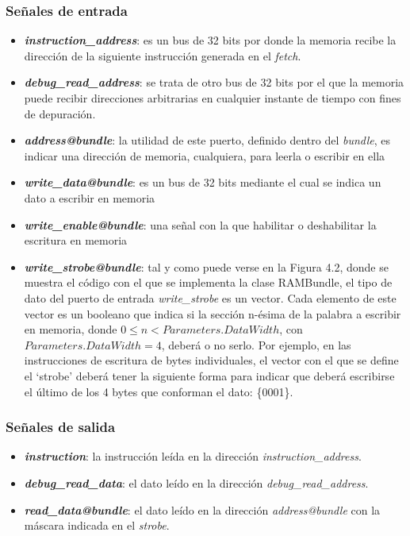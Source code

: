 \subsubsection{Señales de entrada}

\begin{itemize}
  \item \textbf{\textit{instruction\_address}}: es un bus de 32 bits por donde la memoria recibe la dirección de la siguiente instrucción generada en el \textit{fetch}.
  \vspace{-0.2cm}
  \item \textbf{\textit{debug\_read\_address}}: se trata de otro bus de 32 bits por el que la memoria puede recibir direcciones arbitrarias en cualquier instante de tiempo con fines de depuración.
  \vspace{-0.2cm}
  \item \textbf{\textit{address@bundle}}: la utilidad de este puerto, definido dentro del \textit{bundle}, es indicar una dirección de memoria, cualquiera, para leerla o escribir en ella
  \vspace{-0.2cm}
  \item \textbf{\textit{write\_data@bundle}}: es un bus de 32 bits mediante el cual se indica un dato a escribir en memoria
  \vspace{-0.2cm}
  \item \textbf{\textit{write\_enable@bundle}}: una señal con la que habilitar o deshabilitar la escritura en memoria
  \vspace{-0.2cm}
  \item \textbf{\textit{write\_strobe@bundle}}: tal y como puede verse en la Figura 4.2, donde se muestra el código con el que se implementa la clase RAMBundle, el tipo de dato del puerto de entrada \textit{write\_strobe} es un vector. Cada elemento de este vector es un booleano que indica si la sección n-ésima de la palabra a escribir en memoria, donde $0 \le n < Parameters.DataWidth$, con $Parameters.DataWidth = 4$, deberá o no serlo. Por ejemplo, en las instrucciones de escritura de bytes individuales, el vector con el que se define el `strobe' deberá tener la siguiente forma para indicar que deberá escribirse el último de los 4 bytes que conforman el dato: \{0001\}.
\end{itemize}

\subsubsection{Señales de salida}
\begin{itemize}
  \item \textbf{\textit{instruction}}: la instrucción leída en la dirección \textit{instruction\_address}.
  \vspace{-0.2cm}
  \item \textbf{\textit{debug\_read\_data}}: el dato leído en la dirección \textit{debug\_read\_address}.
  \vspace{-0.2cm}
  \item \textbf{\textit{read\_data@bundle}}: el dato leído en la dirección \textit{address@bundle} con la máscara indicada en el \textit{strobe}.
\end{itemize}

